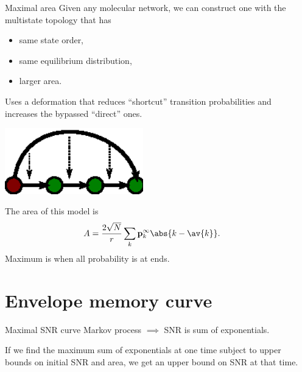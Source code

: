 \documentclass[final,hyperref={pdfpagelabels=false,bookmarks=false}]{beamer}
\newcommand{\net}{molecular network}
\newcommand{\eq}{\mathbf{p}^\infty}
\begin{document}
\begin{frame}{}
\begin{columns}[t]
\begin{column}{0.32\linewidth}
\end{column}

\begin{column}{0.32\linewidth}


\begin{block}{Maximal area}
%
 Given any \net, we can construct one with the multistate topology that has
 \begin{itemize}
   \item same state order,
   \item same equilibrium distribution,
   \item larger area.
 \end{itemize}
 Uses a deformation that reduces ``shortcut'' transition probabilities and increases the bypassed ``direct'' ones.
 \begin{center}
   \includegraphics[width=6cm]{shortcut.eps}
 \end{center}

 \vp The area of this model is
 \begin{equation*}
   A = \frac{2\sqrt{N}}{r}\sum_k \eq_k \abs{k-\av{k}}.
 \end{equation*}
 Maximum is when all probability is at ends.
%
\end{block}







\section{Envelope memory curve}



\begin{block}{Maximal SNR curve}
%
 Markov process $\implies$ SNR is sum of exponentials.

 \vp If we find the maximum sum of exponentials \alert{at one time} subject to upper bounds on initial SNR and area,
 we get an upper bound on SNR at that time.


\end{block}
\end{column}
\end{columns}
\end{frame}
\end{document}
